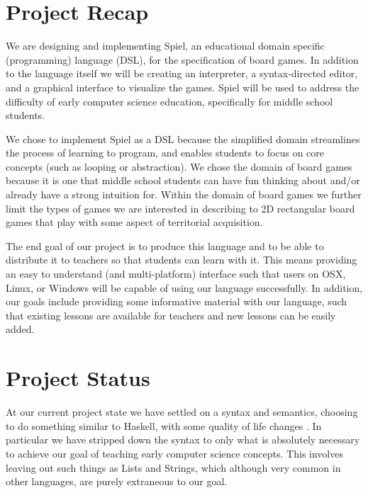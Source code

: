 \documentclass[onecolumn, draftclsnofoot,10pt, compsoc]{IEEEtran}
\begin{document}
\begin{singlespace}

\section{Project Recap}
    We are designing and implementing Spiel, an educational domain specific (programming) language (DSL), for the specification of board games. In addition to the language itself we will be creating an interpreter, a syntax-directed editor, and a graphical interface to visualize the games. Spiel will be used to address the difficulty of early computer science education, specifically for middle school students. 
    
    We chose to implement Spiel as a DSL because the simplified domain streamlines the process of learning to program, and enables students to focus on core concepts (such as looping or abstraction). We chose the domain of board games because it is one that middle school students can have fun thinking about and/or already have a strong intuition for. Within the domain of board games we further limit the types of games we are interested in describing to 2D rectangular board games that play with some aspect of territorial acquisition.
    
    The end goal of our project is to produce this language and to be able to distribute it to teachers so that students can learn with it. This means providing an easy to understand (and multi-platform) interface such that users on OSX, Linux, or Windows will be capable of using our language successfully. In addition, our goals include providing some informative material with our language, such that existing lessons are available for teachers and new lessons can be easily added.
    
\section{Project Status}
    At our current project state we have settled on a syntax and semantics, choosing to do something similar to Haskell, with some quality of life changes \cite{bogl}. In particular we have stripped down the syntax to only what is absolutely necessary to achieve our goal of teaching early computer science concepts. This involves leaving out such things as Lists and Strings, which although very common in other languages, are purely extraneous to our goal. 
    

\end{singlespace}
\end{document}
